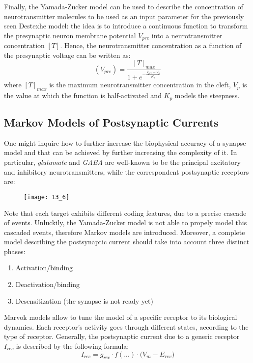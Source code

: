 Finally, the Yamada-Zucker model can be used to describe the concentration of neurotransmitter
molecules to be used as an input parameter for the previously seen Destexhe model: the idea is
to introduce a continuous function to transform the presynaptic neuron membrane potential \(V_{pre}\)
into a neurotransmitter concentration \([T]\). Hence, the neurotransmitter concentration
as a function of the presynaptic voltage can be written as:
\begin{equation*}
    [T](V_{pre})=\frac{[T]_{max}}{1+e^{-\frac{V_{pre}-V_{p}}{K_{p}}}}
\end{equation*}
where \([T]_{max}\) is the maximum neurotransmitter concentration in the cleft, \(V_{p}\) is
the value at which the function is half-activated and \(K_{p}\) models the steepness.

\subsection{Markov Models of Postsynaptic Currents}
One might inquire how to further increase the biophysical accuracy of a synapse model and that can be
achieved by further increasing the complexity of it. In particular, \textit{glutamate} and \textit{GABA}
are well-known to be the principal excitatory and inhibitory neurotransmitters, while the correspondent
postsynaptic receptors are:
\begin{figure}[H]
    \texttt{[image: 13\_6]}
    \centering
\end{figure}
Note that each target exhibits different coding features, due to a precise cascade of events.
Unluckily, the Yamada-Zucker model is not able to propely model this cascaded events, therefore
Markov models are introduced. Moreover, a complete model describing the postsynaptic current should
take into account three distinct phases:
\begin{enumerate}
    \item Activation/binding
    \item Deactivation/binding
    \item Desensitization (the synapse is not ready yet)
\end{enumerate}
Marvok models allow to tune the model of a specific receptor to its biological dynamics. Each receptor's
activity goes through different states, according to the type of receptor. Generally, the
postsynaptic current due to a generic receptor \(I_{rec}\) is described by the following formula:
\begin{equation*}
    I_{rec}=\bar{g}_{rec}\cdot{f(...)}\cdot{\bigl(V_{m}-E_{rev}\bigr)}
\end{equation*}
